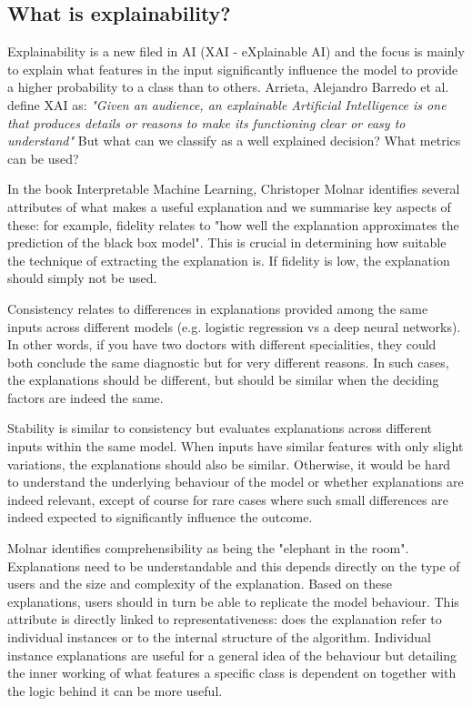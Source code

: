 \documentclass[proposal]{softeng}
\begin{document}
\subsection{What is explainability?}
Explainability is a new filed in AI (XAI - eXplainable AI) and the focus is mainly to explain what features in the input significantly influence the model to provide a higher probability to a class than to others. Arrieta, Alejandro Barredo et al.\cite{BarredoArrietaAlejandro2020EAIX} define XAI as: \textit{"Given an audience, an explainable Artificial Intelligence is one that produces details or reasons to make its functioning clear or easy to understand"}  But what can we classify as a well explained decision? What metrics can be used?

In the book Interpretable Machine Learning, Christoper Molnar \cite{molnar2019} identifies several attributes of what makes a useful explanation and we summarise key aspects of these: for example, fidelity relates to "how well the explanation approximates the prediction of the black box model". This is crucial in determining how suitable the technique of extracting the explanation is. If fidelity is low, the explanation should simply not be used.

Consistency relates to differences in explanations provided among the same inputs across different models (e.g. logistic regression vs a deep neural networks). In other words, if you have two doctors with different specialities, they could both conclude the same diagnostic but for very different reasons. In such cases, the explanations should be different, but should be similar when the deciding factors are indeed the same.

Stability is similar to consistency but evaluates explanations across different inputs within the same model. When inputs have similar features with only slight variations, the explanations should also be similar. Otherwise, it would be hard to understand the underlying behaviour of the model or whether explanations are indeed relevant, except of course for rare cases where such small differences are indeed expected to significantly influence the outcome.

Molnar identifies comprehensibility as being the "elephant in the room". Explanations need to be understandable and this depends directly on the type of users and the size and complexity of the explanation. Based on these explanations, users should in turn be able to replicate the model behaviour. This attribute is directly linked to representativeness: does the explanation refer to individual instances or to the internal structure of the algorithm. Individual instance explanations are useful for a general idea of the behaviour but detailing the inner working of what features a specific class is dependent on together with the logic behind it can be more useful.
\end{document}

